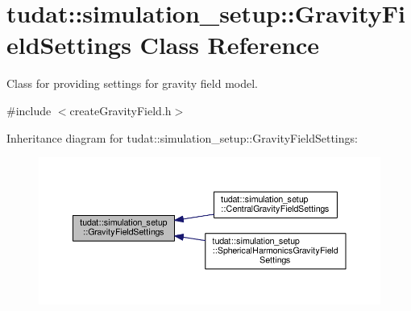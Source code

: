 \hypertarget{classtudat_1_1simulation__setup_1_1GravityFieldSettings}{}\section{tudat\+:\+:simulation\+\_\+setup\+:\+:Gravity\+Field\+Settings Class Reference}
\label{classtudat_1_1simulation__setup_1_1GravityFieldSettings}


Class for providing settings for gravity field model.  




{\ttfamily \#include $<$create\+Gravity\+Field.\+h$>$}



Inheritance diagram for tudat\+:\+:simulation\+\_\+setup\+:\+:Gravity\+Field\+Settings\+:
\nopagebreak
\begin{figure}[H]
\begin{center}
\leavevmode
\includegraphics[width=350pt]{classtudat_1_1simulation__setup_1_1GravityFieldSettings__inherit__graph}
\end{center}
\end{figure}
